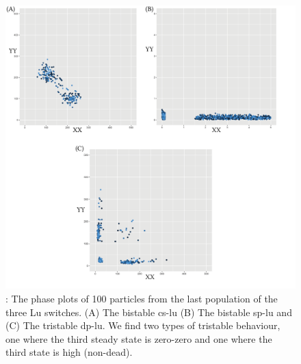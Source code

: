 \begin{figure}[p]
\begin{center}
\includegraphics[width=\textwidth]{../../chapters/chapterStabilityFinder/images/lu_paper_phase.png}
\caption[LoF caption]{ \label{fig:lu_paper_phase}: The phase plots of 100 particles from the last population of the three Lu switches. (A) The bistable \acrshort{cs-lu} (B) The bistable \acrshort{sp-lu} and (C) The tristable \acrshort{dp-lu}. We find two types of tristable behaviour, one where the third steady state is zero-zero and one where the third state is high (non-dead). }
\end{center}
\end{figure}
\clearpage

